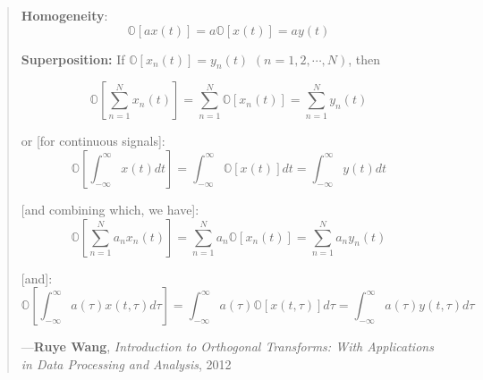 \documentclass[a4paper, 18pt]{book} %
\begin{document}
\begin{appendices}
\noindent
\begin{minipage}{1\textwidth}
\vspace{1em}
\begin{quotation}
{\ttfamily



\textbf{Homogeneity}:\\

\begin{equation}
\mathbb{O}[ax(t)] = a\mathbb{O}[x(t)] = ay(t)
\end{equation}

\vspace{1em}
\textbf{Superposition:} If $\mathbb{O}[x_n(t)] = y_n (t)$ $(n = 1, 2, \cdots,N)$, then

\begin{equation}
\mathbb{O}\left[ \sum\limits_{n=1}^N x_n(t)\right] =  \sum\limits_{n=1}^N \mathbb{O}[x_n(t)] = \sum\limits_{n=1}^N y_n(t)
\end{equation}

\vspace{1em}
or [for continuous signals]:\\

\begin{equation}
\mathbb{O}\left[ \int_{-\infty}^\infty x(t)dt \right] =  \int_{-\infty}^\infty \mathbb{O}[x(t)]dt = \int_{-\infty}^\infty y(t)dt
\end{equation}

\vspace{1em}
[and combining which, we have]:\\

\begin{equation}
\mathbb{O}\left[ \sum\limits_{n=1}^N a_nx_n(t) \right] =  \sum\limits_{n=1}^N a_n\mathbb{O}[x_n(t)] = \sum\limits_{n=1}^N a_ny_n(t)
\end{equation}


\vspace{1em}
[and]:\\

\begin{equation}
\mathbb{O}\left[ \int_{-\infty}^\infty a(\tau)x(t,\tau)d\tau \right] =  \int_{-\infty}^\infty a(\tau)\mathbb{O}[x(t,\tau)]d\tau = \int_{-\infty}^\infty a(\tau)y(t,\tau)d\tau
\end{equation}

}
\hspace*{\fill} ---\textbf{Ruye Wang}, \textit{Introduction to Orthogonal Transforms: With Applications in Data Processing and Analysis}, 2012\cite{Wang2012}
\end{quotation}
\vspace{1em}
\end{minipage}


\end{appendices}
\end{document}
